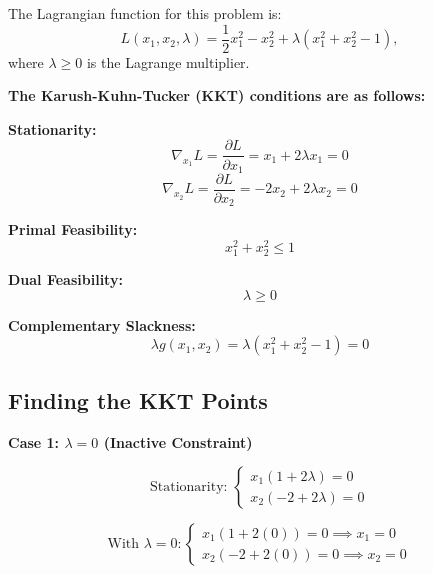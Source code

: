 \documentclass{article}
\begin{document}
The Lagrangian function for this problem is:
\begin{equation}
L(x_1, x_2, \lambda) = \frac{1}{2}x_1^2 - x_2^2 + \lambda (x_1^2 + x_2^2 - 1),
\end{equation}
where $\lambda \geq 0$ is the Lagrange multiplier.

\newpage

\textbf{The Karush-Kuhn-Tucker (KKT) conditions are as follows:}

\textbf{Stationarity:}
\begin{equation}
\nabla_{x_1} L = \frac{\partial L}{\partial x_1} = x_1 + 2\lambda x_1 = 0
\end{equation}
\begin{equation}
\nabla_{x_2} L = \frac{\partial L}{\partial x_2} = -2x_2 + 2\lambda x_2 = 0
\end{equation}

\textbf{Primal Feasibility:}
\begin{equation}
x_1^2 + x_2^2 \leq 1
\end{equation}

\textbf{Dual Feasibility:}
\begin{equation}
\lambda \geq 0
\end{equation}

\textbf{Complementary Slackness:}
\begin{equation}
\lambda g(x_1, x_2) = \lambda(x_1^2 + x_2^2 - 1) = 0
\end{equation}

\subsection{Finding the KKT Points}

\textbf{Case 1: $\lambda = 0$ (Inactive Constraint)}

\begin{equation}
\text{Stationarity: } 
\begin{cases}
x_1(1 + 2\lambda) = 0 \\
x_2(-2 + 2\lambda) = 0
\end{cases}
\end{equation}

\begin{equation}
\text{With } \lambda = 0:
\begin{cases}
x_1(1 + 2(0)) = 0 \implies x_1 = 0 \\
x_2(-2 + 2(0)) = 0 \implies x_2 = 0
\end{cases}
\end{equation}
\end{document}
